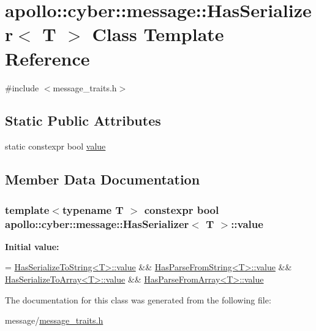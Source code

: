 \hypertarget{classapollo_1_1cyber_1_1message_1_1HasSerializer}{\section{apollo\-:\-:cyber\-:\-:message\-:\-:Has\-Serializer$<$ T $>$ Class Template Reference}
\label{classapollo_1_1cyber_1_1message_1_1HasSerializer}
}


{\ttfamily \#include $<$message\-\_\-traits.\-h$>$}

\subsection*{Static Public Attributes}
\begin{DoxyCompactItemize}
\item 
static constexpr bool \hyperlink{classapollo_1_1cyber_1_1message_1_1HasSerializer_a27c4c58e5968d17a83eee501af7fad89}{value}
\end{DoxyCompactItemize}


\subsection{Member Data Documentation}
\hypertarget{classapollo_1_1cyber_1_1message_1_1HasSerializer_a27c4c58e5968d17a83eee501af7fad89}{
\subsubsection[{value}]{\setlength{\rightskip}{0pt plus 5cm}template$<$typename T $>$ constexpr bool {\bf apollo\-::cyber\-::message\-::\-Has\-Serializer}$<$ T $>$\-::value\hspace{0.3cm}{\ttfamily [static]}}}\label{classapollo_1_1cyber_1_1message_1_1HasSerializer_a27c4c58e5968d17a83eee501af7fad89}
{\bfseries Initial value\-:}
\begin{DoxyCode}
=
      \hyperlink{namespaceapollo_1_1cyber_1_1base_aa3e2fff9b18a1214af4a70546fb7120f}{HasSerializeToString<T>::value} && 
      \hyperlink{namespaceapollo_1_1cyber_1_1base_aa3e2fff9b18a1214af4a70546fb7120f}{HasParseFromString<T>::value} &&
      \hyperlink{namespaceapollo_1_1cyber_1_1base_aa3e2fff9b18a1214af4a70546fb7120f}{HasSerializeToArray<T>::value} && 
      \hyperlink{namespaceapollo_1_1cyber_1_1base_aa3e2fff9b18a1214af4a70546fb7120f}{HasParseFromArray<T>::value}
\end{DoxyCode}


The documentation for this class was generated from the following file\-:\begin{DoxyCompactItemize}
\item 
message/\hyperlink{message__traits_8h}{message\-\_\-traits.\-h}\end{DoxyCompactItemize}
